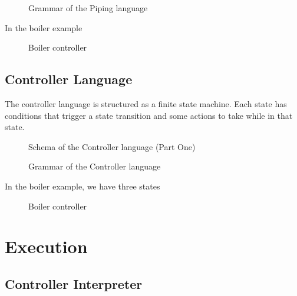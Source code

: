 \documentclass[11pt]{article}
\begin{document}
\begin{figure}
\caption{Grammar of the Piping language}
\label{piping-grammar}
\end{figure}

In the boiler example

\begin{figure}
\caption{Boiler controller}
\label{boiler-controller}
\end{figure}

\subsection{Controller Language}

The controller language is structured as a finite state machine. Each state has conditions that trigger a state transition and some actions to take while in that state.

\begin{figure}
\caption{Schema of the Controller language (Part One)}
\label{controller-grammar}
\end{figure}

\begin{figure}
\caption{Grammar of the Controller language}
\label{controller-grammar}
\end{figure}

In the boiler example, we have three states

\begin{figure}
\caption{Boiler controller}
\label{boiler-controller}
\end{figure}

\section{Execution}

\subsection{Controller Interpreter}
\end{document}
